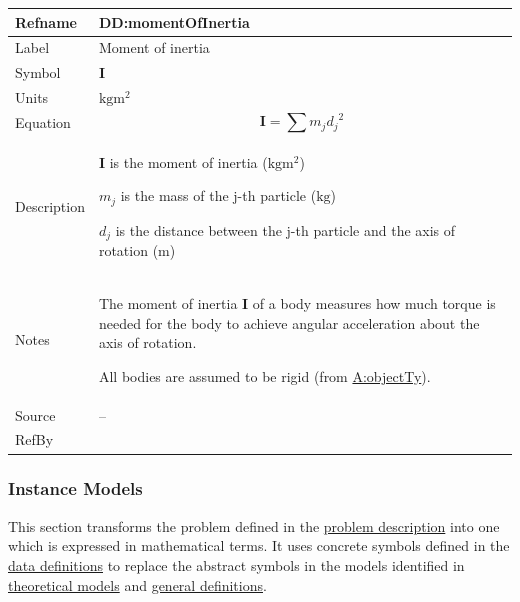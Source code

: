 \documentclass[12pt]{article}
\begin{document}
\vspace{\baselineskip}
\noindent
\begin{minipage}{\textwidth}
\begin{tabular}{>{\raggedright}p{}>{\raggedright\arraybackslash}p{}}
\toprule \textbf{Refname} & \textbf{DD:momentOfInertia}
\label{DD:momentOfInertia}
\\ \midrule
Label & Moment of inertia
        
\\ \midrule
Symbol & $\symbf{I}$
         
\\ \midrule
Units & $\text{kg}\text{m}^{2}$
        
\\ \midrule
Equation & \begin{displaymath}
           \symbf{I}=\displaystyle\sum{{m_{j}} {d_{j}}^{2}}
           \end{displaymath}
\\ \midrule
Description & \begin{symbDescription}
              \item{$\symbf{I}$ is the moment of inertia ($\text{kg}\text{m}^{2}$)}
              \item{${m_{j}}$ is the mass of the j-th particle (${\text{kg}}$)}
              \item{${d_{j}}$ is the distance between the j-th particle and the axis of rotation (${\text{m}}$)}
              \end{symbDescription}
\\ \midrule
Notes & The moment of inertia $\symbf{I}$ of a body measures how much torque is needed for the body to achieve angular acceleration about the axis of rotation.
        
        All bodies are assumed to be rigid (from \hyperref[assumpOT]{A:objectTy}).
        
\\ \midrule
Source & --
         
\\ \midrule
RefBy & 
\\ \bottomrule
\end{tabular}
\end{minipage}

\subsubsection{Instance Models}
\label{Sec:IMs}
This section transforms the problem defined in the \hyperref[Sec:ProbDesc]{problem description} into one which is expressed in mathematical terms. It uses concrete symbols defined in the \hyperref[Sec:DDs]{data definitions} to replace the abstract symbols in the models identified in \hyperref[Sec:TMs]{theoretical models} and \hyperref[Sec:GDs]{general definitions}.
\end{document}
